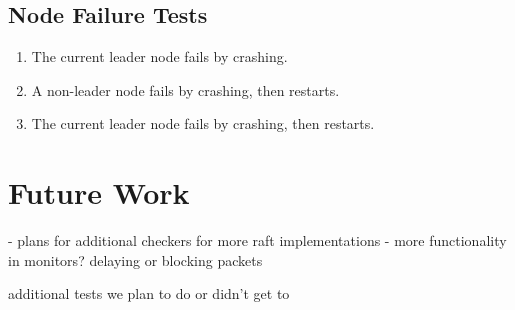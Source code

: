 \documentclass[UTF8]{article}
\begin{document}
\subsection{Node Failure Tests}
\begin{enumerate}
  \item The current leader node fails by crashing.
  \item A non-leader node fails by crashing, then restarts.
  \item The current leader node fails by crashing, then restarts. 
\end{enumerate}

\section{Future Work}

- plans for additional checkers for more raft implementations
- more functionality in monitors? delaying or blocking packets

additional tests we plan to do or didn't get to




\end{document}
